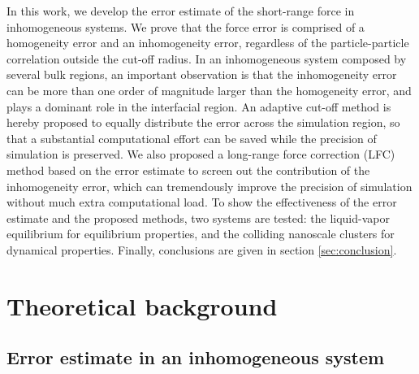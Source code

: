 \documentclass[aps,pre,preprint]{revtex4}
\begin{document}
In this work, we develop the error estimate of the short-range force
in inhomogeneous systems. We prove that the 
force error is comprised of a homogeneity error and an inhomogeneity
error, regardless of the particle-particle correlation outside the
cut-off radius.  In an inhomogeneous system composed by several bulk
regions, an important observation is that the inhomogeneity error can
be more than one order of magnitude larger than the homogeneity
error, and plays a dominant role in the interfacial region. An
adaptive cut-off method is hereby proposed to equally distribute the
error across the simulation region, so that a substantial
computational effort can be saved while the precision of simulation is
preserved. We also proposed a long-range force correction (LFC) method
based on the error estimate to screen out the contribution of the
inhomogeneity error, which can tremendously improve the precision of
simulation without much extra computational load. To show the
effectiveness of the error estimate and the proposed methods, two
systems are tested: the liquid-vapor equilibrium for equilibrium
properties, and the colliding nanoscale clusters for dynamical
properties. Finally, conclusions are given in section
\ref{sec:conclusion}.




\section{Theoretical background}
\subsection{Error estimate in an inhomogeneous system}
\end{document}
